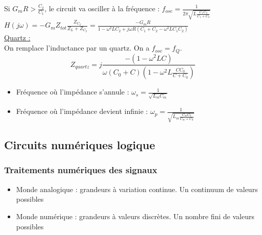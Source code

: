 \documentclass[../main.tex]{subfiles}
\begin{document}
Si $G_mR>\frac{C_2}{C_1}$, le circuit va osciller à la fréquence : $f_{osc} = \frac{1}{2\pi \sqrt{L\frac{C_1C_2}{C_1+C_2}}}$\\

$H(j\omega) = -G_m Z_{tot} \frac{Z_{C_2}}{Z_L + Z_{C_2}} = \frac{-G_m R}{1-\omega^2 LC_2 + j\omega R(C_1+C_2 - \omega^2LC_1C_2)}$\\

\quad \underline{Quartz :}\\

On remplace l'inductance par un quartz. On a $f_{osc} = f_Q$.\\

\begin{equation}
    Z_{quartz} = j\frac{-(1-\omega^2LC)}{\omega(C_0+C)(1-\omega^2L\frac{CC_0}{C+C_0})}
\end{equation}

\begin{itemize}
    \item Fréquence où l'impédance s'annule : $\omega_s = \frac{1}{\sqrt{L_mC_m}}$\\
    \item Fréquence où l'impédance devient infinie : $\omega_p = \frac{1}{\sqrt{L_m \frac{C_mC_0}{C_m+C_0}}}$\\
\end{itemize}

\subsection{Circuits numériques logique}
\subsubsection{Traitements numériques des signaux}

\begin{itemize}
    \item Monde analogique : grandeurs à variation continue. Un continuum de valeurs possibles \\
    \item Monde numérique : grandeurs à valeurs discrètes. Un nombre fini de valeurs possibles\\
\end{itemize}
\end{document}

